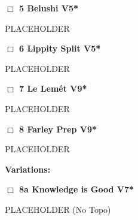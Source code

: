 	\begin{multicols}{2}


\needspace{1.5cm}
\label{rt:Belushi}
\colorbox{RoyalBlue!20}{
\parbox{0.95\linewidth}{
\hspace{-1ex}\textbf{$\Box$
5 Belushi V5*  
}}}
\begin{adjustwidth}{1.3em}{}			
PLACEHOLDER
\end{adjustwidth}




\needspace{1.5cm}
\label{rt:Lippity Split}
\colorbox{RoyalBlue!20}{
\parbox{0.95\linewidth}{
\hspace{-1ex}\textbf{$\Box$
6 Lippity Split V5*  
}}}
\begin{adjustwidth}{1.3em}{}			
PLACEHOLDER
\end{adjustwidth}




\needspace{1.5cm}
\label{rt:Le Lemét}
\colorbox{Goldenrod!20}{
\parbox{0.95\linewidth}{
\hspace{-1ex}\textbf{$\Box$
7 Le Lemét V9*  
}}}
\begin{adjustwidth}{1.3em}{}			
PLACEHOLDER
\end{adjustwidth}




\needspace{1.5cm}
\label{rt:Farley Prep}
\colorbox{Goldenrod!20}{
\parbox{0.95\linewidth}{
\hspace{-1ex}\textbf{$\Box$
8 Farley Prep V9*  
}}}
\begin{adjustwidth}{1.3em}{}			
PLACEHOLDER
\end{adjustwidth}


\begin{adjustwidth}{0.5cm}{}				
\needspace{3cm}
\textbf{Variations:} \newline

\needspace{1.5cm}
\label{vr:Knowledge is Good}
\colorbox{Goldenrod!20}{
\parbox{0.95\linewidth}{
\hspace{-1ex}\textbf{$\Box$
8a Knowledge is Good V7*  
}}}
\begin{adjustwidth}{1.3em}{}			
PLACEHOLDER
  (No Topo)
\end{adjustwidth}



\end{adjustwidth}




\end{multicols}
\clearpage